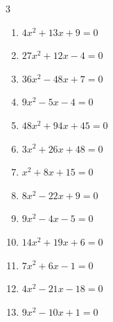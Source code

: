 \begin{multicols}{3}
\begin{enumerate}
  \item $4x^{2}+13x+9=0$


  \item $27x^{2}+12x-4=0$


  \item $36x^{2}-48x+7=0$


\columnbreak %

  \item $9x^{2}-5x-4=0$


  \item $48x^{2}+94x+45=0$


  \item $3x^{2}+26x+48=0$


  \item $x^{2}+8x+15=0$

        \phantom{$\displaystyle x=-3,\; -5$}

  \item $8x^{2}-22x+9=0$


  \item $9x^{2}-4x-5=0$


  \item $14x^{2}+19x+6=0$


  \item $7x^{2}+6x-1=0$


  \item $4x^{2}-21x-18=0$


  \item $9x^{2}-10x+1=0$


\end{enumerate}
\end{multicols}

